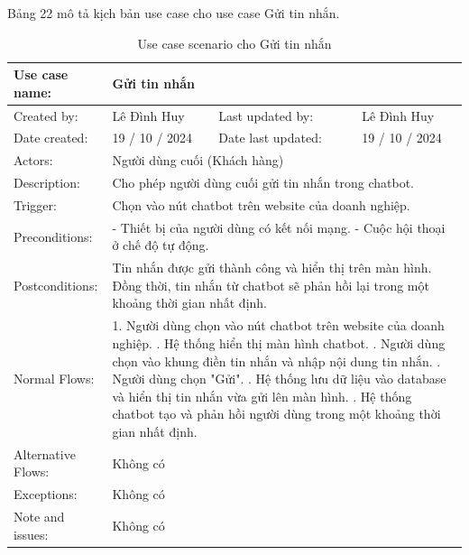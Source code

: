 Bảng 22 mô tả kịch bản use case cho use case Gửi tin nhắn.

\begin{table}[H]
    \centering
    \begin{tabular}{|l|l|l|l|} 
        \hline
        Use case name: & \multicolumn{3}{|l|}{Gửi tin nhắn} \\
        \hline
        Created by: & Lê Đình Huy & Last updated by: & Lê Đình Huy \\
        \hline
        Date created: & 19 / 10 / 2024 & Date last updated: & 19 / 10 / 2024 \\
        \hline
        Actors: & \multicolumn{3}{|l|}{Người dùng cuối (Khách hàng)} \\
        \hline
        Description: & \multicolumn{3}{|p{12cm}|}{Cho phép người dùng cuối gửi tin nhắn trong chatbot.} \\ 
        \hline
        Trigger: & \multicolumn{3}{|p{12cm}|}{Chọn vào nút chatbot trên website của doanh nghiệp.} \\
        \hline
        Preconditions: & \multicolumn{3}{|p{12cm}|}{- Thiết bị của người dùng có kết nối mạng. \newline - Cuộc hội thoại ở chế độ tự động.} \\
        \hline
        Postconditions: & \multicolumn{3}{|p{12cm}|}{Tin nhắn được gửi thành công và hiển thị trên màn hình. \newline
        Đồng thời, tin nhắn từ chatbot sẽ phản hồi lại trong một khoảng thời gian nhất định.} \\
        \hline
        Normal Flows: & \multicolumn{3}{|p{12cm}|}{1. Người dùng chọn vào nút chatbot trên website của doanh nghiệp. \newline
        2. Hệ thống hiển thị màn hình chatbot. \newline
        3. Người dùng chọn vào khung điền tin nhắn và nhập nội dung tin nhắn. \newline
        4. Người dùng chọn "Gửi". \newline
        5. Hệ thống lưu dữ liệu vào database và hiển thị tin nhắn vừa gửi lên màn hình. \newline
        6. Hệ thống chatbot tạo và phản hồi người dùng trong một khoảng thời gian nhất định.} \\
        \hline
        Alternative Flows: & \multicolumn{3}{|p{12cm}|}{Không có} \\
        \hline
        Exceptions: & \multicolumn{3}{|p{12cm}|}{Không có} \\
        \hline
        Note and issues: & \multicolumn{3}{|p{12cm}|}{Không có} \\
        \hline
    \end{tabular}
    \caption{Use case scenario cho Gửi tin nhắn}
\end{table}


